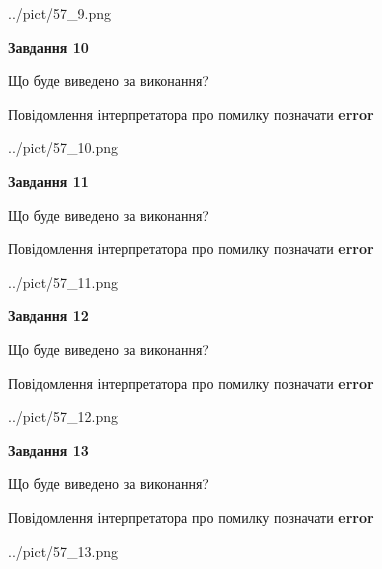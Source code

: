 \documentclass[11pt, ukrainian]{article}
\begin{document}
{\begin {large}
\begin{center}
	{../pict/57_9.png}
\end{center}
\newpage

{\begin {center}\textbf{Завдання 10}\end {center}}\par
Що буде виведено за виконання? \par
Повідомлення інтерпретатора про помилку позначати \textbf{error}

\begin{center}
	{../pict/57_10.png}
\end{center}
\newpage

{\begin {center}\textbf{Завдання 11}\end {center}}\par
Що буде виведено за виконання? \par
Повідомлення інтерпретатора про помилку позначати \textbf{error}

\begin{center}
	{../pict/57_11.png}
\end{center}
\newpage

{\begin {center}\textbf{Завдання 12}\end {center}}\par
Що буде виведено за виконання? \par
Повідомлення інтерпретатора про помилку позначати \textbf{error}

\begin{center}
	{../pict/57_12.png}
\end{center}
\newpage

{\begin {center}\textbf{Завдання 13}\end {center}}\par
Що буде виведено за виконання? \par
Повідомлення інтерпретатора про помилку позначати \textbf{error}

\begin{center}
	{../pict/57_13.png}
\end{center}
\newpage


\end{large}}
\end{document}
